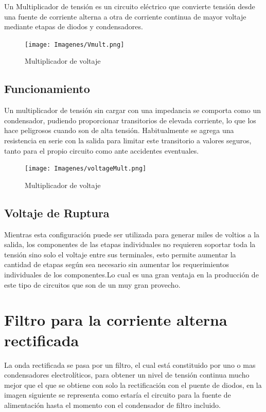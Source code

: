 \documentclass{article}
\begin{document}
Un Multiplicador de tensión es un circuito eléctrico que convierte tensión desde una fuente de corriente alterna a otra de corriente continua de mayor voltaje mediante etapas de diodos y condensadores.\citep{multiplicadorTendionWiki}

\begin{figure}[h!]
    \centering
    \texttt{[image: Imagenes/Vmult.png]}
    \caption{Multiplicador de voltaje}
    \label{fig:multV1}
\end{figure}

\subsection{Funcionamiento}

Un multiplicador de tensión sin cargar con una impedancia se comporta como un condensador, pudiendo proporcionar transitorios de elevada corriente, lo que los hace peligrosos cuando son de alta tensión. Habitualmente se agrega una resistencia en serie con la salida para limitar este transitorio a valores seguros, tanto para el propio circuito como ante accidentes eventuales.\citep{multiplicadorTendionWiki}

\begin{figure}[h!]
    \centering
    \texttt{[image: Imagenes/voltageMult.png]}
    \caption{Multiplicador de voltaje}
    \label{fig:multV2}
\end{figure}

\subsection{Voltaje de Ruptura}

Mientras esta configuración puede ser utilizada para generar miles de voltios a la salida, los componentes de las etapas individuales no requieren soportar toda la tensión sino solo el voltaje entre sus terminales, esto permite aumentar la cantidad de etapas según sea necesario sin aumentar los requerimientos individuales de los componentes.Lo cual es una gran ventaja en la producción de este tipo de circuitos que son de un muy gran provecho.\citep{multiplicadorTendionWiki}

\section{Filtro para la corriente alterna rectificada}

La onda rectificada se pasa por un filtro, el cual está constituido por uno o mas condensadores electrolíticos, para obtener un nivel de tensión continua mucho mejor que el que se obtiene con solo la rectificación con el puente de diodos, en la imagen siguiente se representa como estaría el circuito para la fuente de alimentación hasta el momento con el condensador de filtro incluido.\citep{FiltroParaCorrienteAlterna}
\end{document}
